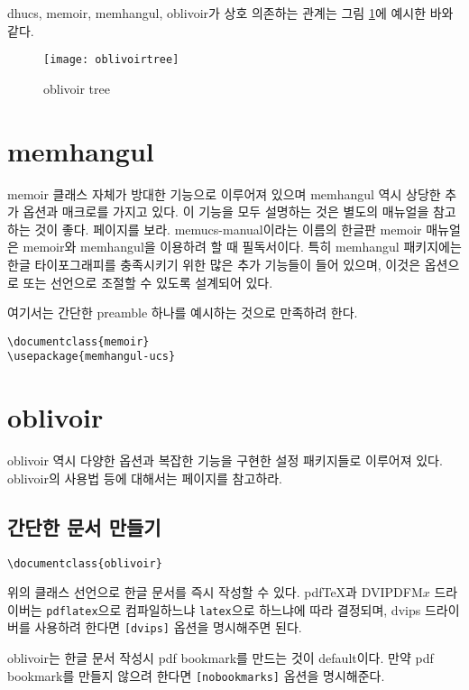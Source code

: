dhucs, memoir, memhangul, oblivoir가 상호 의존하는 관계는
그림 \ref{fig:oblivoirtree}에 예시한 바와 같다.

\begin{figure}
\centering
\texttt{[image: oblivoirtree]}
\caption{oblivoir tree}\label{fig:oblivoirtree}
\end{figure}


\section{memhangul}

memoir 클래스 자체가 방대한 기능으로 이루어져 있으며 memhangul 역시
상당한 추가 옵션과 매크로를 가지고 있다. 이 기능을 모두 설명하는 것은
별도의 매뉴얼을 참고하는 것이 좋다.  페이지를
보라. memucs-manual이라는 이름의 한글판 memoir 매뉴얼은 memoir와
memhangul을 이용하려 할 때 필독서이다.
특히 memhangul 패키지에는 한글 타이포그래피를 충족시키기 위한
많은 추가 기능들이 들어 있으며, 이것은 옵션으로 또는 선언으로 조절할
수 있도록 설계되어 있다.

여기서는 간단한 preamble 하나를 예시하는 것으로 만족하려 한다.
\begin{verbatim}
\documentclass{memoir}
\usepackage{memhangul-ucs}
\end{verbatim}

\section{oblivoir}

oblivoir 역시 다양한 옵션과 복잡한 기능을 구현한 설정 패키지들로
이루어져 있다. oblivoir의 사용법 등에 대해서는  페이지를 참고하라.

\subsection{간단한 문서 만들기}

\begin{verbatim}
\documentclass{oblivoir}
\end{verbatim}

위의 클래스 선언으로 한글 문서를 즉시 작성할 수 있다. pdf\TeX 과 
DVIPDFM$x$ 드라이버는 \verb|pdflatex|으로 컴파일하느냐 \verb|latex|으로
하느냐에 따라 결정되며, dvips 드라이버를 사용하려 한다면 \verb|[dvips]|
옵션을 명시해주면 된다.

oblivoir는 한글 문서 작성시 pdf bookmark를 만드는 것이 default이다.
만약 pdf bookmark를 만들지 않으려 한다면 \verb|[nobookmarks]| 옵션을
명시해준다. 

